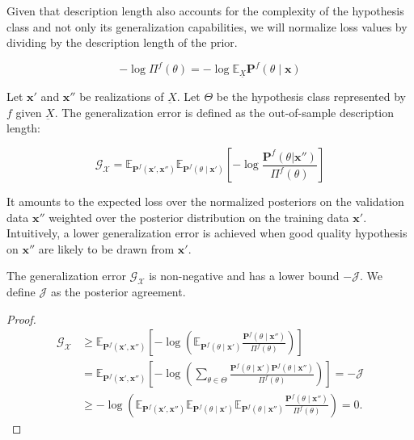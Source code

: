 Given that description length also accounts for the complexity of the hypothesis
class and not only its generalization capabilities, we will normalize loss values by
dividing by the description length of the prior.

$$
    - \log \Pi^f (\theta) = - \log \mathbb{E}_{\underline{X}} \mathbf{P}^f (\theta \mid \bm{x})
$$

\begin{definition}
    Let $\bm{x'}$ and $\bm{x''}$ be realizations of $\underbar{X}$.
    Let $\Theta$ be the hypothesis class represented by $f$ given $\underbar{X}$. 
    The generalization error is defined as the out-of-sample description length:

    $$
        \mathcal{G}_{\mathcal{X}} = \mathbb{E}_{\mathbf{P}^f(\bm{x}', \bm{x}'')} \mathbb{E}_{\mathbf{P}^f( \theta \mid \bm{x}')} \left[ - \log \frac{\mathbf{P}^f(\theta | \bm{x}'')}{\Pi^f (\theta)} \right]
    $$
    
\end{definition}

It amounts to the expected loss over the normalized posteriors on the validation data
$\bm{x}''$ weighted over the posterior distribution on the training data $\bm{x}'$.
Intuitively, a lower generalization error is achieved when good quality hypothesis
on $\bm{x}''$ are likely to be drawn from $\bm{x}'$. 

\begin{lemma}\label{lemma:pa}
    The generalization error $\mathcal{G}_{\mathcal{X}}$ is non-negative and has a lower bound $-\mathcal{J}$. We define $\mathcal{J}$ as the posterior agreement.
\end{lemma}
\begin{proof}
    $$
    \begin{aligned}
        \mathcal{G}_{\mathcal{X}} & \geq \mathbb{E}_{\mathbf{P}^f(\bm{x}', \bm{x}'')}\left[-\log \left(\mathbb{E}_{\mathbf{P}^f( \theta \mid \bm{x}')} \frac{\mathbf{P}^{f}\left(\theta \mid \bm{x}''\right)}{\Pi^{f}(\theta)}\right)\right] \\
        & =\mathbb{E}_{\mathbf{P}^f(\bm{x}', \bm{x}'')} \left[-\log \left(\sum_{\theta \in \Theta} \frac{\mathbf{P}^{f}\left(\theta \mid \bm{x}'\right) \mathbf{P}^{f}\left(\theta \mid \bm{x}'' \right)}{\Pi^{f}(\theta)}\right)\right] = -\mathcal{J} \\
        & \geq-\log \left(\mathbb{E}_{\mathbf{P}^f(\bm{x}', \bm{x}'')} \mathbb{E}_{\mathbf{P}^f( \theta \mid \bm{x}')} \mathbb{E}_{\mathbf{P}^f(\theta \mid \bm{x}'')} \frac{\mathbf{P}^{f}\left(\theta \mid \bm{x}''\right)}{\Pi^{f}(\theta)}\right)=0 .
    \end{aligned}
    $$
\end{proof}

